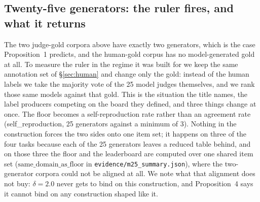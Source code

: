 \documentclass{article}
\newcommand{\ids}[1]{\texttt{\small #1}} %
\begin{document}
\subsection{Twenty-five generators: the ruler fires, and what it returns}
\label{sec:m25}\label{sec:imposedgold}
The two judge-gold corpora above have exactly two generators, which is the case Proposition~1 predicts, and the
human-gold corpus has no model-generated gold at all. To measure the ruler in the regime it was built for we keep
the same annotation set of \S\ref{sec:human} and change only the gold: instead of the human labels we take the
majority vote of the 25 model judges themselves, and we rank those same models against that
gold. This is the situation the title names, the label producers competing on the board they defined, and three
things change at once. The floor becomes a self-reproduction rate rather than an agreement rate
(self\_reproduction, 25 generators against a minimum of 3). Nothing in the construction forces the two sides
onto one item set; it happens on three of the four tasks because each of the 25 generators leaves a reduced
table behind, and on those three the floor and the leaderboard are computed over one shared item set
($\mathrm{same\_domain\_as\_floor}$ in \ids{evidence/m25\_summary.json}), where the
two-generator corpora could not be aligned at all. We note what that alignment does not buy: $\delta = 2.0$ never gets to bind on this construction, and
Proposition~4 says it cannot bind on any construction shaped like it.
\end{document}
